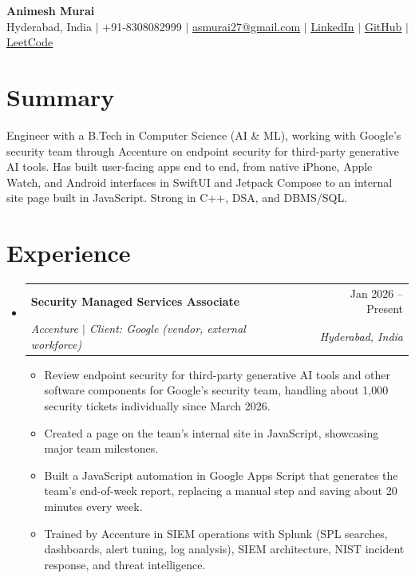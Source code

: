 \documentclass[a4paper,11pt]{article}
\makeatletter
\newcommand{\resumeItem}[1]{\item\small{#1\vspace{-1pt}}}
\newcommand{\resumeSubheading}[4]{
  \vspace{-1pt}\item
    \begin{tabularx}{0.97\textwidth}[t]{@{}>{\raggedright\arraybackslash}X@{\hspace{0.75em}}r@{}}
      \textbf{#1} & #2 \\
      \textit{\small#3} & \textit{\small #4} \\
    \end{tabularx}\vspace{-3pt}
}
\newcommand{\resumeSubItemListStart}{\begin{itemize}[leftmargin=0.15in, label={}]}
\newcommand{\resumeSubItemListEnd}{\end{itemize}}
\newcommand{\resumeItemListStart}{\begin{itemize}[itemsep=2pt]}
\newcommand{\resumeItemListEnd}{\end{itemize}\vspace{-2pt}}
\makeatother
\begin{document}
\begin{center}
    {\Huge\bfseries Animesh Murai} \\ \vspace{4pt}
    \small Hyderabad, India $|$ +91-8308082999 $|$
    \href{mailto:asmurai27@gmail.com}{\underline{asmurai27@gmail.com}} $|$
    \href{https://www.linkedin.com/in/animesh-murai-538384253/}{\underline{LinkedIn}} $|$
    \href{https://github.com/muraias7781}{\underline{GitHub}} $|$
    \href{https://leetcode.com/u/sAMurai7781/}{\underline{LeetCode}}
\end{center}

\section{Summary}
  \small{Engineer with a B.Tech in Computer Science (AI \& ML), working with Google's security team through Accenture on endpoint security for third-party generative AI tools. Has built user-facing apps end to end, from native iPhone, Apple Watch, and Android interfaces in SwiftUI and Jetpack Compose to an internal site page built in JavaScript. Strong in C++, DSA, and DBMS/SQL.}

\section{Experience}
  \resumeSubItemListStart

    \resumeSubheading
      {Security Managed Services Associate}{Jan 2026 -- Present}
      {Accenture $|$ Client: Google (vendor, external workforce)}{Hyderabad, India}
      \resumeItemListStart
        \resumeItem{Review endpoint security for third-party generative AI tools and other software components for Google's security team, handling about 1,000 security tickets individually since March 2026.}
        \resumeItem{Created a page on the team's internal site in JavaScript, showcasing major team milestones.}
        \resumeItem{Built a JavaScript automation in Google Apps Script that generates the team's end-of-week report, replacing a manual step and saving about 20 minutes every week.}
        \resumeItem{Trained by Accenture in SIEM operations with Splunk (SPL searches, dashboards, alert tuning, log analysis), SIEM architecture, NIST incident response, and threat intelligence.}
      \resumeItemListEnd

  \resumeSubItemListEnd
\end{document}
